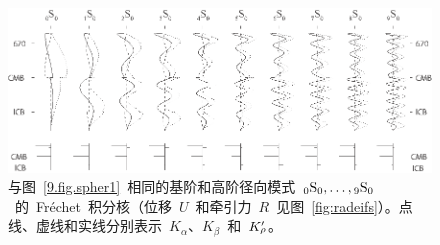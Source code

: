 \begin{figure}
\begin{center}
\includegraphics{../figures/chap09/fig06.eps}
\end{center}
\caption[radkernels]{\label{9.fig.spher2}
与图~\ref{9.fig.spher1}~相同的基阶和高阶径向模式~${}_0{\rm S}_0, \ldots,{}_9{\rm S}_0$~的~Fr\'{e}chet~积分核（位移~$U$~和牵引力~$R$~见图~\ref{fig:radeifs}）。点线、虚线和实线分别表示~$K_{\alpha}$、$K_{\beta}$~和~$K_{\raisebox{0.3 ex}{\scriptsize$\rho$}}^{\prime}$。
}
\end{figure}

